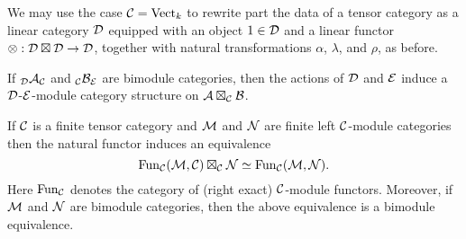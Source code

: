 \documentclass{amsart}
\begin{document}


\begin{remark}
	We may use the case $\mathcal C= \mathrm{Vect}_k$ to rewrite part the data  of a tensor category as a linear category $\mathcal D$ equipped with an object $1 \in \mathcal D$ and a linear functor $\otimes: \mathcal D \boxtimes \mathcal D \to \mathcal D $, together with natural transformations $\alpha$, $\lambda$, and $\rho$, as before. 
\end{remark}

\begin{remark}
	If ${}_{\mathcal D}\mathcal A_{\mathcal C}$ and ${}_{\mathcal C}\mathcal B_{\mathcal E}$ are bimodule categories, then the actions of $\mathcal D$ and $\mathcal E$ induce a $\mathcal D$-$\mathcal E$-module category structure on $\mathcal A \boxtimes_{\mathcal C} \mathcal B$. 
\end{remark}

\begin{lemma} \label{Lma:FunctorsAsATensorPdt}
	If $\mathcal C$ is a finite tensor category and $\mathcal M$ and $\mathcal N$ are finite left $\mathcal C$-module categories then the natural functor induces an equivalence
	\begin{equation*}
		\operatorname{Fun}_\mathcal C(\mathcal M, \mathcal C) \boxtimes_\mathcal C \mathcal N \simeq \operatorname{Fun}_\mathcal C(\mathcal M,\mathcal N).
	\end{equation*}
	Here $\operatorname{Fun}_\mathcal C$ denotes the category of (right exact) $\mathcal C$-module functors. 
	Moreover, if $\mathcal M$ and $\mathcal N$ are bimodule categories, then the above equivalence is a bimodule equivalence. 
\end{lemma}
\end{document}
